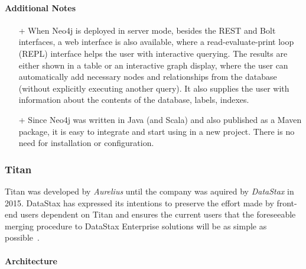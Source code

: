 
\paragraph{Additional Notes}
\begin{itemize}[topsep=0pt]
  \item[+] When Neo4j is deployed in server mode, besides the REST and Bolt interfaces, a web interface is also available, where a read-evaluate-print loop (REPL) interface helps the user with interactive querying. The results are either shown in a table or an interactive graph display, where the user can automatically add necessary nodes and relationships from the database (without explicitly executing another query). It also supplies the user with information about the contents of the database, labels, indexes.
  \item[+] Since Neo4j was written in Java (and Scala) and also published as a Maven package, it is easy to integrate and start using in a new project. There is no need for installation or configuration.
\end{itemize}

\subsubsection{Titan}
\label{sect:titan}

Titan was developed by \emph{Aurelius} until the company was aquired by \emph{DataStax} in 2015. DataStax has expressed its intentions to preserve the effort made by front-end users dependent on Titan and ensures the current users that the foreseeable merging procedure to DataStax Enterprise solutions will be as simple as possible~\cite{titan-datastax-acquirement}.

\paragraph{Architecture}

